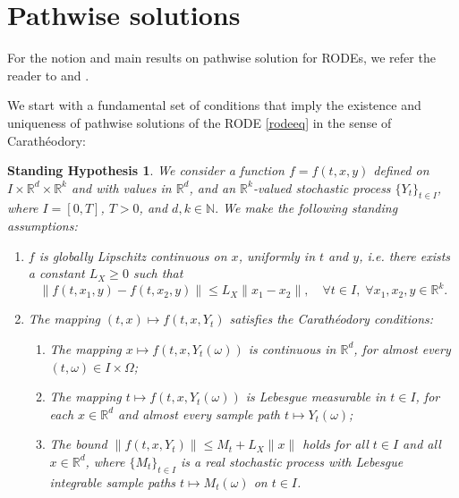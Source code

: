 \documentclass[reqno,12pt]{amsart}
\theoremstyle{plain} %
\newtheorem{stdhyp}{Standing Hypothesis}[section]
\theoremstyle{definition} %
\begin{document}
\section{Pathwise solutions}
\label{secpathwisesolution}

For the notion and main results on pathwise solution for RODEs, we refer the reader to \cite[Section 2.1]{HanKloeden2017} and \cite[Section 3.3]{NeckelRupp2013}.

We start with a fundamental set of conditions that imply the existence and uniqueness of pathwise solutions of the RODE \eqref{rodeeq} in the sense of Carath\'eodory:

\begin{stdhyp}
    \label{standinghypotheses1}
    We consider a function $f=f(t, x, y)$ defined on $I\times \mathbb{R}^d\times\mathbb{R}^k$ and with values in $\mathbb{R}^d$, and an $\mathbb{R}^k$-valued stochastic process $\{Y_t\}_{t\in I}$, where $I=[0, T]$, $T > 0$, and $d, k\in \mathbb{N}.$ We make the following standing assumptions:
    \begin{enumerate}
        \item \label{standinghypotheses1Lx} $f$ is globally Lipschitz continuous on $x$, uniformly in $t$ and $y$, i.e. there exists a constant $L_X \geq 0$ such that
            \begin{equation}
                \label{Lxassumptionbasic}
                \|f(t, x_1, y) - f(t, x_2, y)\| \leq L_X \|x_1 - x_2\|, \quad \forall t \in I, \;\forall x_1, x_2, y\in\mathbb{R}^k.
            \end{equation}

        \item \label{standinghypotheses1Car} The mapping $(t, x) \mapsto f(t, x, Y_t)$ satisfies the Carath\'eodory conditions:
            \begin{enumerate}
                \item The mapping $x \mapsto f(t, x, Y_t(\omega))$ is continuous in $\mathbb{R}^d$, for almost every $(t, \omega)\in I\times \Omega$;
                \item The mapping $t \mapsto f(t, x, Y_t(\omega))$ is Lebesgue measurable in $t\in I$, for each $x\in \mathbb{R}^d$ and almost every sample path $t \mapsto Y_t(\omega)$;
                \item \label{standinghypotheses1Carboundonf} The bound $\|f(t, x, Y_t)\| \leq M_t + L_X\|x\|$ holds for all $t\in I$ and all $x\in\mathbb{R}^d$, where $\{M_t\}_{t\in I}$ is a real stochastic process with Lebesgue integrable sample paths $t\mapsto M_t(\omega)$ on $t\in I$.
            \end{enumerate}
    \end{enumerate}
\end{stdhyp}
\end{document}
